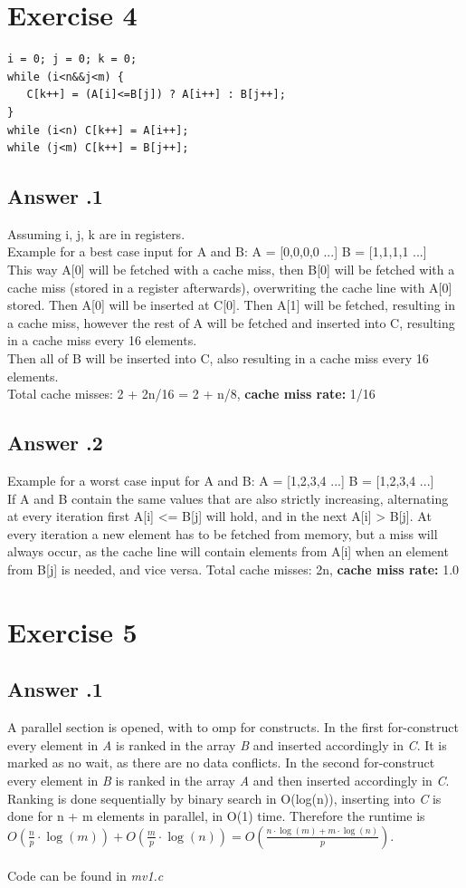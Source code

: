 \documentclass[a4paper,%
11pt,%
DIV=12,
headsepline,%
headings=normal,
]{scrartcl}
\newcounter{curex}
\newcommand{\exercise}[1]{\section*{Exercise #1}\setcounter{curex}{#1}}
\newcommand{\answer}[1]{\subsection*{Answer \arabic{curex}.#1}}
\begin{document}
\newpage
\exercise{4}

\begin{minipage}[t]{1.0\linewidth}
\begin{lstlisting}
i = 0; j = 0; k = 0; 
while (i<n&&j<m) {
   C[k++] = (A[i]<=B[j]) ? A[i++] : B[j++]; 
}
while (i<n) C[k++] = A[i++]; 
while (j<m) C[k++] = B[j++];
\end{lstlisting}
\end{minipage}

\answer{1}
Assuming i, j, k are in registers. \\
Example for a best case input for A and B:
A = [0,0,0,0 ...] 
B = [1,1,1,1 ...] \\
This way A[0] will be fetched with a cache miss, then B[0] will be fetched with a cache miss (stored in a register afterwards), overwriting the cache line with A[0] stored. Then A[0] will be inserted at C[0].
Then A[1] will be fetched, resulting in a cache miss, however the rest of A will be fetched and inserted into C, resulting in a cache miss every 16 elements. \\
Then all of B will be inserted into C, also resulting in a cache miss every 16 elements. \\
Total cache misses: 2 + 2n/16 = 2 + n/8, \textbf{cache miss rate:} 1/16

\answer{2}
Example for a worst case input for A and B:
A = [1,2,3,4 ...] 
B = [1,2,3,4 ...] \\
If A and B contain the same values that are also strictly increasing, alternating at every iteration first A[i] <= B[j] will hold, and in the next A[i] > B[j]. At every iteration a new element has to be fetched from memory, but a miss will always occur, as the cache line will contain elements from A[i] when an element from B[j] is needed, and vice versa.  
Total cache misses: 2n, \textbf{cache miss rate:} 1.0

\exercise{5}

\answer{1}
A parallel section is opened, with to omp for constructs. In the first for-construct every element in \emph{A} is ranked in the array \emph{B} and inserted accordingly in \emph{C}. It is marked as no wait, as there are no data conflicts. In the second for-construct every element in \emph{B} is ranked in the array \emph{A} and then inserted accordingly in \emph{C}. Ranking is done sequentially by binary search in O(log(n)), inserting into \emph{C} is done for n + m elements in parallel, in O(1) time. Therefore the runtime is $ O\left(\frac{n}{p} \cdot \log(m) \right) + O\left(\frac{m}{p} \cdot \log(n)\right) = 
O\left(\frac{n \cdot \log(m) + m \cdot \log(n)}{p}\right)$.
\\
\\
Code can be found in \textit{mv1.c}
\end{document}
